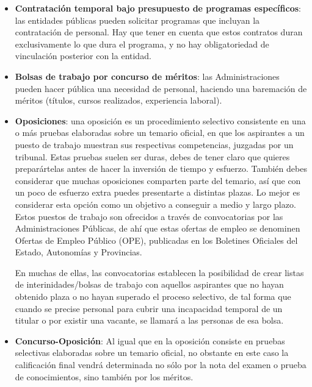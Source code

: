 \begin{itemize}
    \item \textbf{Contratación temporal bajo presupuesto de programas específicos}: las entidades públicas pueden solicitar programas que incluyan la contratación de personal. Hay que tener en cuenta que estos contratos duran exclusivamente lo que dura el programa, y no hay obligatoriedad de vinculación posterior con la entidad.

    \item \textbf{Bolsas de trabajo por concurso de méritos}: las Administraciones pueden hacer pública una necesidad de personal, haciendo una baremación de méritos (títulos, cursos realizados, experiencia laboral).

    \item \textbf{Oposiciones}: una oposición es un procedimiento selectivo consistente en una o más pruebas elaboradas sobre un temario oficial, en que los aspirantes a un puesto de trabajo muestran sus respectivas competencias, juzgadas por un tribunal. Estas pruebas suelen ser duras, debes de tener claro que quieres preparártelas antes de hacer la inversión de tiempo y esfuerzo. También debes considerar que muchas oposiciones comparten parte del temario, así que con un poco de esfuerzo extra puedes presentarte a distintas plazas. Lo mejor es considerar esta opción como un objetivo a conseguir a medio y largo plazo. Estos puestos de trabajo son ofrecidos a través de convocatorias por las Administraciones Públicas, de ahí que estas ofertas de empleo se denominen Ofertas de Empleo Público (OPE), publicadas en los Boletines Oficiales del Estado, Autonomías y Provincias.

    En muchas de ellas, las convocatorias establecen la posibilidad de crear listas de interinidades/bolsas de trabajo con aquellos aspirantes que no hayan obtenido plaza o no hayan superado el proceso selectivo, de tal forma que cuando se precise personal para cubrir una incapacidad temporal de un titular o por existir una vacante, se llamará a las personas de esa bolsa.

    \item \textbf{Concurso-Oposición}: Al igual que en la oposición consiste en pruebas selectivas elaboradas sobre un temario oficial, no obstante en este caso la calificación final vendrá determinada no sólo por la nota del examen o prueba de conocimientos, sino también por los méritos.
\end{itemize}

